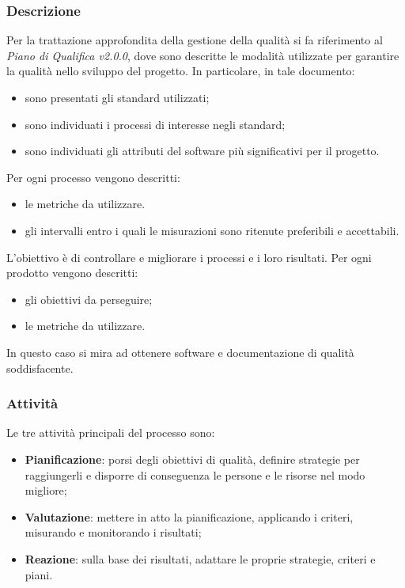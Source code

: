 	\subsubsection{Descrizione}
	Per la trattazione approfondita della gestione della qualità si fa riferimento al \textit{Piano di Qualifica v2.0.0}, dove sono descritte le modalità utilizzate per garantire la qualità nello sviluppo del progetto. In particolare, in tale documento:
	\begin{itemize}
		\item sono presentati gli standard utilizzati;
		\item sono individuati i processi di interesse negli standard;
		\item sono individuati gli attributi del software più significativi per il progetto.
	\end{itemize}
	Per ogni processo vengono descritti:
	\begin{itemize}
		\item le metriche da utilizzare.
		\item gli intervalli entro i quali le misurazioni sono ritenute preferibili e accettabili.
	\end{itemize}
	L'obiettivo è di controllare e migliorare i processi e i loro 
	risultati.\newline
	Per ogni prodotto vengono descritti:
	\begin{itemize}
		\item gli obiettivi da perseguire;
		\item le metriche da utilizzare.
	\end{itemize}
	In questo caso si mira ad ottenere software e documentazione di qualità soddisfacente.
	\subsubsection{Attività}
	Le tre attività principali del processo sono:
	\begin{itemize}
		\item \textbf{Pianificazione}: porsi degli obiettivi di qualità, definire strategie per raggiungerli e disporre di conseguenza le persone e le risorse nel modo migliore;
		\item \textbf{Valutazione}: mettere in atto la pianificazione, applicando i criteri, misurando e monitorando i risultati; 
		\item \textbf{Reazione}: sulla base dei risultati, adattare le proprie strategie, criteri e piani.
	\end{itemize}
